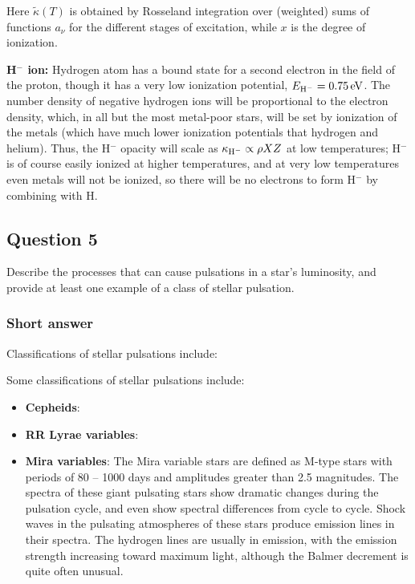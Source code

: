 \documentclass[a4paper,10pt]{article}
\begin{document}
{\noindent}Here $\tilde{\kappa}(T)$ is obtained by Rosseland integration over (weighted) sums of functions $a_\nu$ for the different stages of excitation, while $x$ is the degree of ionization.

{\noindent}\textbf{H$^-$ ion:} Hydrogen atom has a bound state for a second electron in the field of the proton, though it has a very low ionization potential, $E_{{\rm H}^-}=0.75\,{\rm eV}$. The number density of negative hydrogen ions will be proportional to the electron density, which, in all but the most metal-poor stars, will be set by ionization of the metals (which have much lower ionization potentials that hydrogen and helium). Thus, the H$^-$ opacity will scale as $\kappa_{{\rm H}^-} \propto \rho XZ$ at low temperatures; H$^-$ is of course easily ionized at higher temperatures, and at very low temperatures even metals will not be ionized, so there will be no electrons to form H$^-$ by combining with H.


\newpage
\subsection{Question 5}

Describe the processes that can cause pulsations in a star's luminosity, and provide at least one example of a class of stellar pulsation.

\subsubsection{Short answer}

Classifications of stellar pulsations include:

Some classifications of stellar pulsations include:

\begin{itemize}
    \item \textbf{Cepheids}: 
    \item \textbf{RR Lyrae variables}: 
    \item \textbf{Mira variables}: The Mira variable stars are defined as M-type stars with periods of 80 – 1000 days and amplitudes greater than 2.5 magnitudes. The spectra of these giant pulsating stars show dramatic changes during the pulsation cycle, and even show spectral differences from cycle to cycle. Shock waves in the pulsating atmospheres of these stars produce emission lines in their spectra. The hydrogen lines are usually in emission, with the emission strength increasing toward maximum light, although the Balmer decrement is quite often unusual.
\end{itemize}
\end{document}

